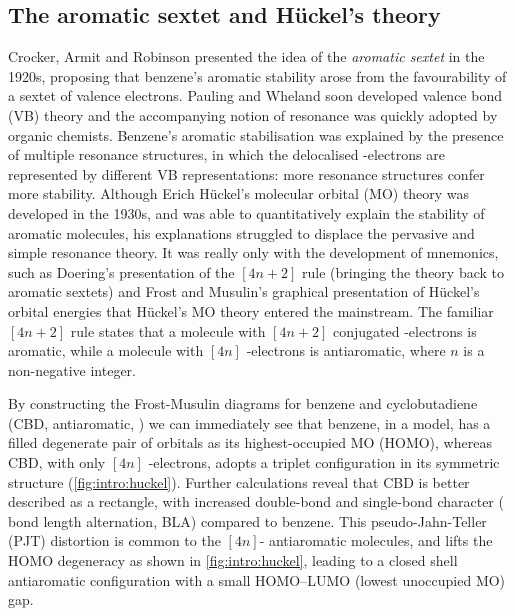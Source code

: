 	\subsection{The aromatic sextet and H\"uckel's theory}

		Crocker, Armit and Robinson presented the idea of the \textit{aromatic sextet} in the 1920s, proposing that benzene's aromatic stability arose from the favourability of a sextet of valence electrons.\autocite{Crocker1922,Armit1925,Balaban2005} Pauling and Wheland soon developed valence bond (VB) theory and the accompanying notion of resonance was quickly adopted by organic chemists. Benzene's aromatic stabilisation was explained by the presence of multiple resonance structures, in which the delocalised \pii{}-electrons are represented by different VB representations: more resonance structures confer more stability.\autocite{pauling1933nature} Although Erich H\"uckel's molecular orbital (MO) theory was developed in the 1930s, and was able to quantitatively explain the stability of aromatic molecules, his explanations struggled to displace the pervasive and simple resonance theory.\autocite{huckel1937grundzuge,berson1999chemical} It was really only with the development of mnemonics, such as Doering's presentation of the $[4n+2]$ rule\autocite{Doering1951} (bringing the theory back to aromatic sextets) and Frost and Musulin's graphical presentation of H\"uckel's orbital energies\autocite{Frost1953} that H\"uckel's MO theory entered the mainstream.\autocite{berson1999chemical} The familiar $[4n+2]$ rule states that a molecule with $[4n+2]$ conjugated \pii{}-electrons is aromatic, while a molecule with $[4n]$ \pii{}-electrons is antiaromatic, where $n$ is a non-negative integer. 

		By constructing the Frost-Musulin diagrams for benzene and cyclobutadiene (CBD, antiaromatic, )  we can immediately see that benzene, in a  model, has a filled degenerate pair of orbitals as its highest-occupied MO (HOMO), whereas CBD, with only $[4n]$ \pii{}-electrons, adopts a triplet configuration in its  symmetric structure (\autoref{fig:intro:huckel}). Further calculations reveal that CBD is better described as a  rectangle, with increased double-bond and single-bond character ( bond length alternation, BLA) compared to benzene.\autocite{Bally1980} This pseudo-Jahn-Teller (PJT)\autocite{Kertesz2005} distortion is common to the $[4n]$-\pii{} antiaromatic molecules, and lifts the HOMO degeneracy as shown in \autoref{fig:intro:huckel}, leading to a closed shell antiaromatic configuration with a small HOMO--LUMO (lowest unoccupied MO) gap.


